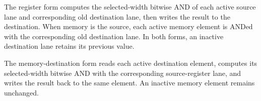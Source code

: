 The register form computes the selected-width bitwise AND of each active source
lane and corresponding old destination lane, then writes the result to the
destination. When memory is the source, each active memory element is ANDed
with the corresponding old destination lane. In both forms, an inactive
destination lane retains its previous value.

The memory-destination form reads each active destination element, computes its
selected-width bitwise AND with the corresponding source-register lane, and
writes the result back to the same element. An inactive memory element remains
unchanged.
